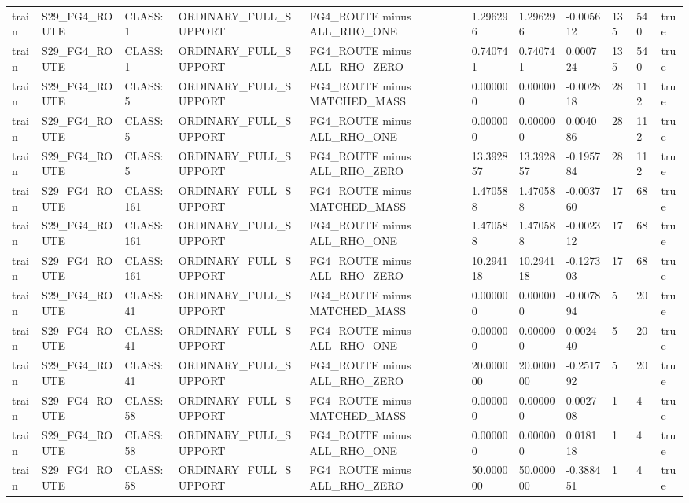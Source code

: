 \begin{tabular}{lllllllllll}
train & S29\_FG4\_ROUTE & CLASS:1 & ORDINARY\_FULL\_SUPPORT & FG4\_ROUTE minus ALL\_RHO\_ONE & 1.296296 & 1.296296 & -0.005612 & 135 & 540 & true \\
train & S29\_FG4\_ROUTE & CLASS:1 & ORDINARY\_FULL\_SUPPORT & FG4\_ROUTE minus ALL\_RHO\_ZERO & 0.740741 & 0.740741 & 0.000724 & 135 & 540 & true \\
train & S29\_FG4\_ROUTE & CLASS:5 & ORDINARY\_FULL\_SUPPORT & FG4\_ROUTE minus MATCHED\_MASS & 0.000000 & 0.000000 & -0.002818 & 28 & 112 & true \\
train & S29\_FG4\_ROUTE & CLASS:5 & ORDINARY\_FULL\_SUPPORT & FG4\_ROUTE minus ALL\_RHO\_ONE & 0.000000 & 0.000000 & 0.004086 & 28 & 112 & true \\
train & S29\_FG4\_ROUTE & CLASS:5 & ORDINARY\_FULL\_SUPPORT & FG4\_ROUTE minus ALL\_RHO\_ZERO & 13.392857 & 13.392857 & -0.195784 & 28 & 112 & true \\
train & S29\_FG4\_ROUTE & CLASS:161 & ORDINARY\_FULL\_SUPPORT & FG4\_ROUTE minus MATCHED\_MASS & 1.470588 & 1.470588 & -0.003760 & 17 & 68 & true \\
train & S29\_FG4\_ROUTE & CLASS:161 & ORDINARY\_FULL\_SUPPORT & FG4\_ROUTE minus ALL\_RHO\_ONE & 1.470588 & 1.470588 & -0.002312 & 17 & 68 & true \\
train & S29\_FG4\_ROUTE & CLASS:161 & ORDINARY\_FULL\_SUPPORT & FG4\_ROUTE minus ALL\_RHO\_ZERO & 10.294118 & 10.294118 & -0.127303 & 17 & 68 & true \\
train & S29\_FG4\_ROUTE & CLASS:41 & ORDINARY\_FULL\_SUPPORT & FG4\_ROUTE minus MATCHED\_MASS & 0.000000 & 0.000000 & -0.007894 & 5 & 20 & true \\
train & S29\_FG4\_ROUTE & CLASS:41 & ORDINARY\_FULL\_SUPPORT & FG4\_ROUTE minus ALL\_RHO\_ONE & 0.000000 & 0.000000 & 0.002440 & 5 & 20 & true \\
train & S29\_FG4\_ROUTE & CLASS:41 & ORDINARY\_FULL\_SUPPORT & FG4\_ROUTE minus ALL\_RHO\_ZERO & 20.000000 & 20.000000 & -0.251792 & 5 & 20 & true \\
train & S29\_FG4\_ROUTE & CLASS:58 & ORDINARY\_FULL\_SUPPORT & FG4\_ROUTE minus MATCHED\_MASS & 0.000000 & 0.000000 & 0.002708 & 1 & 4 & true \\
train & S29\_FG4\_ROUTE & CLASS:58 & ORDINARY\_FULL\_SUPPORT & FG4\_ROUTE minus ALL\_RHO\_ONE & 0.000000 & 0.000000 & 0.018118 & 1 & 4 & true \\
train & S29\_FG4\_ROUTE & CLASS:58 & ORDINARY\_FULL\_SUPPORT & FG4\_ROUTE minus ALL\_RHO\_ZERO & 50.000000 & 50.000000 & -0.388451 & 1 & 4 & true \\

\end{tabular}
